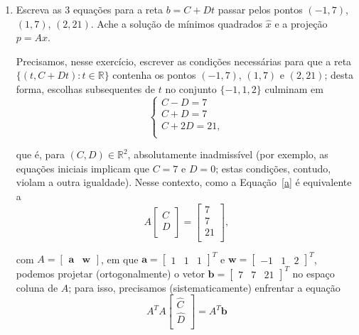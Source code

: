 \documentclass[leqno]{article}
\begin{document}
\begin{enumerate}


\item Escreva as 3 equações para a reta $b = C + Dt$ passar pelos pontos $(-1,7)$, $(1,7)$, $(2,21)$. Ache a solução de mínimos quadrados $\hat{x}$ e a projeção $p = A\hat{x}$.

\begin{sol}
	Precisamos, nesse exercício, escrever as condições necessárias para que a reta $\{(t, C + Dt) : t \in \mathbb{R}\}$ contenha os pontos $(-1, 7)$, $(1, 7)$ e $(2, 21)$; desta forma, escolhas subsequentes de $t$ no conjunto $\{-1, 1, 2\}$ culminam em 
	\begin{equation} \label{a}  
		\begin{cases} 
			C - D = 7 \\ 
			C + D = 7 \\ 
			C + 2D = 21, \\ 
		\end{cases} 
	\end{equation} 

	\noindent que é, para $(C, D) \in \mathbb{R}^{2}$, absolutamente inadmissível (por exemplo, as equações iniciais implicam que $C = 7$ e $D = 0$; estas condições, contudo, violam a outra igualdade). Nesse contexto, como a Equação~\eqref{a} é equivalente a 
	\begin{equation*} 
		A 
		\begin{bmatrix} 
			C \\ 
			D \\ 
		\end{bmatrix} = 
		\begin{bmatrix} 
			7 \\ 
			7 \\ 
			21 \\ 
		\end{bmatrix},  
	\end{equation*} 
	
	\noindent com $A = \begin{bmatrix} \mathbf{a} & \mathbf{w} \end{bmatrix}$, em que $\mathbf{a} = \begin{bmatrix} 1 & 1 & 1 \end{bmatrix}^{T}$ e $\mathbf{w} = \begin{bmatrix} -1 & 1 & 2 \end{bmatrix}^{T}$, podemos projetar (ortogonalmente) o vetor $\mathbf{b} = \begin{bmatrix} 7 & 7 & 21 \end{bmatrix}^{T}$ no espaço coluna de $A$; para isso, precisamos (sistematicamente) enfrentar a equação 
	\begin{equation*} 
		A^{T}A 
		\begin{bmatrix} 
			\hat C \\ 
			\hat D \\ 
		\end{bmatrix} = 
		A^{T}\mathbf{b}    
	\end{equation*} 
	

\end{sol}
\end{enumerate}
\end{document}
